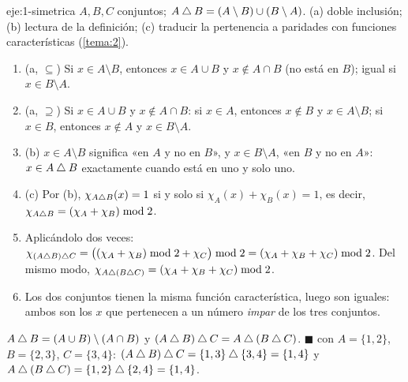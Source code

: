 \begin{solucion}{eje:1-simetrica}
\datos $A,B,C$ conjuntos; $A\mathbin{\triangle} B=(A\setminus B)\cup(B\setminus A)$.
\planteamiento (a) doble inclusión; (b) lectura de la definición; (c) traducir la pertenencia a paridades con funciones características (\cref{tema:2}).
\pasos
\begin{enumerate}[label=\arabic*.]
  \item (a, $\subseteq$) Si $x\in A\setminus B$, entonces $x\in A\cup B$ y $x\notin A\cap B$ (no está en $B$); igual si $x\in B\setminus A$.
  \item (a, $\supseteq$) Si $x\in A\cup B$ y $x\notin A\cap B$: si $x\in A$, entonces $x\notin B$ y $x\in A\setminus B$; si $x\in B$, entonces $x\notin A$ y $x\in B\setminus A$.
  \item (b) $x\in A\setminus B$ significa «en $A$ y no en $B$», y $x\in B\setminus A$, «en $B$ y no en $A$»: $x\in A\mathbin{\triangle} B$ exactamente cuando está en uno y solo uno.
  \item (c) Por (b), $\chi_{A\mathbin{\triangle} B}(x)=1$ si y solo si $\chi_A(x)+\chi_B(x)=1$, es decir, $\chi_{A\mathbin{\triangle} B}=(\chi_A+\chi_B)\bmod 2$.
  \item Aplicándolo dos veces: $\chi_{(A\mathbin{\triangle} B)\mathbin{\triangle} C}=\bigl((\chi_A+\chi_B)\bmod2+\chi_C\bigr)\bmod2=(\chi_A+\chi_B+\chi_C)\bmod 2$. Del mismo modo, $\chi_{A\mathbin{\triangle}(B\mathbin{\triangle} C)}=(\chi_A+\chi_B+\chi_C)\bmod2$.
  \item Los dos conjuntos tienen la misma función característica, luego son iguales: ambos son los $x$ que pertenecen a un número \emph{impar} de los tres conjuntos.
\end{enumerate}
\resultado $A\mathbin{\triangle} B=(A\cup B)\setminus(A\cap B)$ y $(A\mathbin{\triangle} B)\mathbin{\triangle} C=A\mathbin{\triangle}(B\mathbin{\triangle} C)$. \hfill$\blacksquare$
\comprobacion con $A=\{1,2\}$, $B=\{2,3\}$, $C=\{3,4\}$: $(A\mathbin{\triangle} B)\mathbin{\triangle} C=\{1,3\}\mathbin{\triangle}\{3,4\}=\{1,4\}$ y $A\mathbin{\triangle}(B\mathbin{\triangle} C)=\{1,2\}\mathbin{\triangle}\{2,4\}=\{1,4\}$.
\end{solucion}

